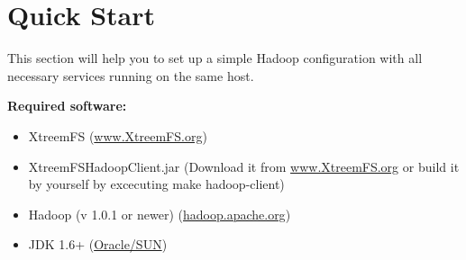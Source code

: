\documentclass[a4paper,10pt]{book}
\begin{document}
\section{Quick Start}
\label{sec:hadoop_quickstart}

This section will help you to set up a simple Hadoop configuration with all necessary services running on the same host.

\textbf{Required software:}
\begin{itemize}
\item XtreemFS (\href{http://code.google.com/p/xtreemfs/downloads/list}{www.XtreemFS.org})
\item XtreemFSHadoopClient.jar (Download it from \href{http://www.xtreemfs.org/downloads/XtreemFSHadoopClient.jar}{www.XtreemFS.org} or build it by yourself by excecuting make hadoop-client)
\item Hadoop (v 1.0.1 or newer) (\href{http://hadoop.apache.org}{hadoop.apache.org})
\item JDK 1.6+ (\href{http://java.sun.com}{Oracle/SUN})
\end{itemize}
\end{document}
